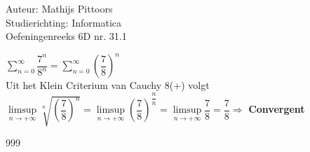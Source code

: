 \documentclass[a4paper]{article}
\begin{document}
  
\noindent \large Auteur: Mathijs Pittoors \\
\noindent \large Studierichting: Informatica\\
\noindent \large Oefeningenreeks 6D nr. 31.1\\

\medskip

\normalsize

$\displaystyle\sum_{n=0}^\infty \dfrac{7^n}{8^n} = \displaystyle\sum_{n=0}^\infty \left(\dfrac{7}{8}\right)^n$\\

Uit het Klein Criterium van Cauchy 8(+) volgt\\

$\limsup\limits_{n\rightarrow +\infty} \sqrt[n]{\left(\dfrac{7}{8}\right)^n} = \limsup\limits_{n\rightarrow +\infty} \left(\dfrac{7}{8
}\right)^{\dfrac{n}{n}} = \limsup\limits_{n\rightarrow +\infty} \dfrac{7}{8} = \dfrac{7}{8}\Rightarrow$ \textbf{Convergent}


\begin{thebibliography}{999}
\end{thebibliography}
\end{document}
